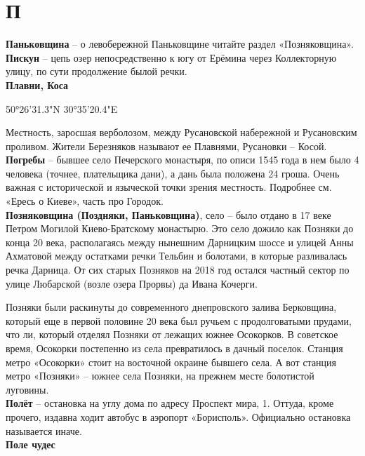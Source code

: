 \chapter*{П}

\textbf{Паньковщина} – о левобережной Паньковщине читайте раздел «Позняковщина».\\

\textbf{Пискун} – цепь озер непосредственно к югу от Ерёмина через Коллекторную улицу, по сути продолжение былой речки.\\

\textbf{Плавни, Коса}

50°26'31.3"N 30°35'20.4"E

Местность, заросшая верболозом, между Русановской набережной и Русановским проливом. Жители Березняков называют ее Плавнями, Русановки – Косой.\\


\textbf{Погребы} – бывшее село Печерского монастыря, по описи 1545 года в нем было 4 человека (точнее, плательщика дани), а дань была положена 24 гроша. Очень важная с исторической и языческой точки зрения местность. Подробнее см. «Ересь о Киеве», часть про Городок.\\

\textbf{Позняковщина (Поздняки, Паньковщина)}, село – было отдано в 17 веке Петром Могилой Киево-Братскому монастырю. Это село дожило как Позняки до конца 20 века, располагаясь между нынешним Дарницким шоссе и улицей Анны Ахматовой между остатками речки Тельбин и болотами, в которые разливалась речка Дарница. От сих старых Позняков на 2018 год остался частный сектор по улице Любарской (возле озера Прорвы) да Ивана Кочерги.

Позняки были раскинуты до современного днепровского залива Берковщина, который еще в первой половине 20 века был ручьем с продолговатыми прудами, что ли, который отделял Позняки от лежащих южнее Осокорков. В советское время, Осокорки постепенно из села превратилось в дачный поселок. Станция метро «Осокорки» стоит на восточной окраине бывшего села. А вот станция метро «Позняки» – южнее села Позняки, на прежнем месте болотистой луговины.\\

\textbf{Полёт} – остановка на углу дома по адресу Проспект мира, 1. Оттуда, кроме прочего, издавна ходит автобус в аэропорт «Борисполь». Официально остановка называется иначе.\\ 

\textbf{Поле чудес}

